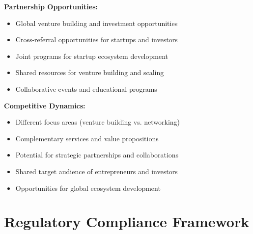 \textbf{Partnership Opportunities:}
\begin{itemize}
    \item Global venture building and investment opportunities
    \item Cross-referral opportunities for startups and investors
    \item Joint programs for startup ecosystem development
    \item Shared resources for venture building and scaling
    \item Collaborative events and educational programs
\end{itemize}

\textbf{Competitive Dynamics:}
\begin{itemize}
    \item Different focus areas (venture building vs. networking)
    \item Complementary services and value propositions
    \item Potential for strategic partnerships and collaborations
    \item Shared target audience of entrepreneurs and investors
    \item Opportunities for global ecosystem development
\end{itemize}

\section{Regulatory Compliance Framework}

